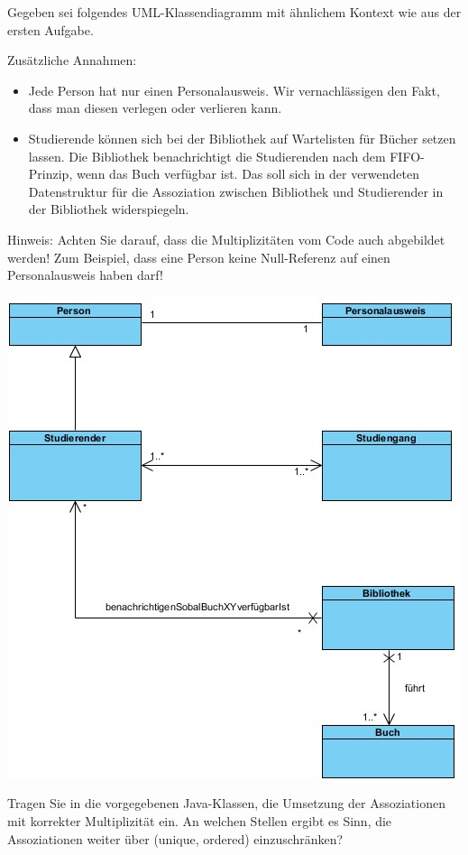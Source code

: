 \documentclass{abgabe}
\begin{document}
\begin{questions}

    Gegeben sei folgendes UML-Klassendiagramm mit ähnlichem Kontext wie aus der ersten Aufgabe.

    Zusätzliche Annahmen:
    \begin{itemize}
        \item Jede Person hat nur einen Personalausweis.
              Wir vernachlässigen den Fakt, dass man diesen verlegen oder verlieren kann.
        \item Studierende können sich bei der Bibliothek auf Wartelisten für Bücher setzen lassen.
              Die Bibliothek benachrichtigt die Studierenden nach dem FIFO-Prinzip, wenn das Buch verfügbar ist.
              Das soll sich in der verwendeten Datenstruktur für die Assoziation zwischen Bibliothek und Studierender in der Bibliothek widerspiegeln.
    \end{itemize}

    Hinweis: Achten Sie darauf, dass die Multiplizitäten vom Code auch abgebildet werden! Zum Beispiel, dass eine Person keine Null-Referenz auf einen Personalausweis haben darf!

    \begin{center}
        \includegraphics[width=.5\textwidth]{swt_h07_muster.jpg}
    \end{center}

    Tragen Sie in die vorgegebenen Java-Klassen, die Umsetzung der Assoziationen mit korrekter Multiplizität ein. An welchen Stellen ergibt es Sinn, die Assoziationen weiter über (unique, ordered) einzuschränken?
\end{questions}
\end{document}
